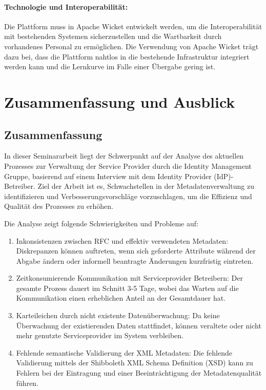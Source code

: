 \documentclass[a4paper, fontsize=11pt]{scrartcl}
\begin{document}
\paragraph{Technologie und Interoperabilität:}
Die Plattform muss in Apache Wicket entwickelt werden, um die Interoperabilität mit bestehenden Systemen sicherzustellen und die Wartbarkeit durch vorhandenes Personal zu ermöglichen.
Die Verwendung von Apache Wicket trägt dazu bei, dass die Plattform nahtlos in die bestehende Infrastruktur integriert werden kann und die Lernkurve im Falle einer Übergabe gering ist.

\section{Zusammenfassung und Ausblick}\label{sec:summary}
\subsection{Zusammenfassung}\label{subsec:summary}
In dieser Seminararbeit liegt der Schwerpunkt auf der Analyse des aktuellen Prozesses zur Verwaltung der Service Provider durch die Identity Management Gruppe, basierend auf einem Interview mit dem Identity Provider (IdP)-Betreiber.
Ziel der Arbeit ist es, Schwachstellen in der Metadatenverwaltung zu identifizieren und Verbesserungsvorschläge vorzuschlagen, um die Effizienz und Qualität des Prozesses zu erhöhen.

Die Analyse zeigt folgende Schwierigkeiten und Probleme auf:

\begin{enumerate}
    \item Inkonsistenzen zwischen RFC und effektiv verwendeten Metadaten: Diskrepanzen können auftreten, wenn sich geforderte Attribute während der Abgabe ändern oder informell beantragte Änderungen kurzfristig eintreten.
    \item Zeitkonsumierende Kommunikation mit Serviceprovider Betreibern: Der gesamte Prozess dauert im Schnitt 3-5 Tage, wobei das Warten auf die Kommunikation einen erheblichen Anteil an der Gesamtdauer hat.
    \item Karteileichen durch nicht existente Datenüberwachung: Da keine Überwachung der existierenden Daten stattfindet, können veraltete oder nicht mehr genutzte Serviceprovider im System verbleiben.
    \item Fehlende semantische Validierung der XML Metadaten: Die fehlende Validierung mittels der Shibboleth XML Schema Definition (XSD) kann zu Fehlern bei der Eintragung und einer Beeinträchtigung der Metadatenqualität führen.
\end{enumerate}
\end{document}
